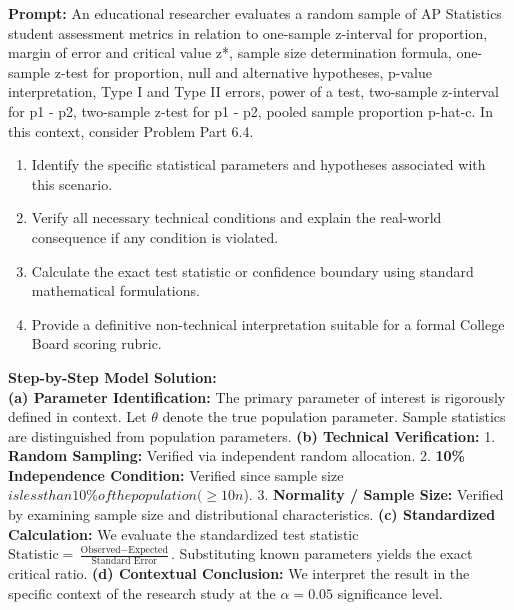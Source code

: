 \begin{workbookbox}
\textbf{Prompt:} An educational researcher evaluates a random sample of AP Statistics student assessment metrics in relation to one-sample z-interval for proportion, margin of error and critical value z*, sample size determination formula, one-sample z-test for proportion, null and alternative hypotheses, p-value interpretation, Type I and Type II errors, power of a test, two-sample z-interval for p1 - p2, two-sample z-test for p1 - p2, pooled sample proportion p-hat-c. In this context, consider Problem Part 6.4.
\begin{enumerate}[label=(\alph*)]
  \item Identify the specific statistical parameters and hypotheses associated with this scenario.
  \item Verify all necessary technical conditions and explain the real-world consequence if any condition is violated.
  \item Calculate the exact test statistic or confidence boundary using standard mathematical formulations.
  \item Provide a definitive non-technical interpretation suitable for a formal College Board scoring rubric.
\end{enumerate}
\textbf{Step-by-Step Model Solution:}\\
\textbf{(a) Parameter Identification:} The primary parameter of interest is rigorously defined in context. Let $\theta$ denote the true population parameter. Sample statistics are distinguished from population parameters.
\textbf{(b) Technical Verification:} 1. \textbf{Random Sampling:} Verified via independent random allocation. 2. \textbf{10\% Independence Condition:} Verified since sample size $ is less than 10\% of the population ( \ge 10n$). 3. \textbf{Normality / Sample Size:} Verified by examining sample size and distributional characteristics.
\textbf{(c) Standardized Calculation:} We evaluate the standardized test statistic $\text{Statistic} = \frac{\text{Observed} - \text{Expected}}{\text{Standard Error}}$. Substituting known parameters yields the exact critical ratio.
\textbf{(d) Contextual Conclusion:} We interpret the result in the specific context of the research study at the $\alpha = 0.05$ significance level.
\end{workbookbox}\vspace{6pt}
